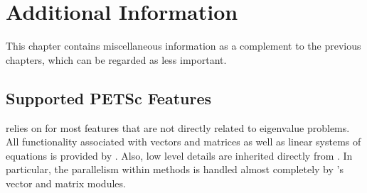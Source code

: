 \chapter{\label{cap:add}Additional Information}

\noindent This chapter contains miscellaneous information as a complement to the previous chapters, which can be regarded as less important.

\section{Supported PETSc Features}

\slepc relies on \petsc for most features that are not directly related to eigenvalue problems. All functionality associated with vectors and matrices as well as linear systems of equations is provided by \petsc. Also, low level details are inherited directly from \petsc. In particular, the parallelism within \slepc methods is handled almost completely by \petsc's vector and matrix modules.

